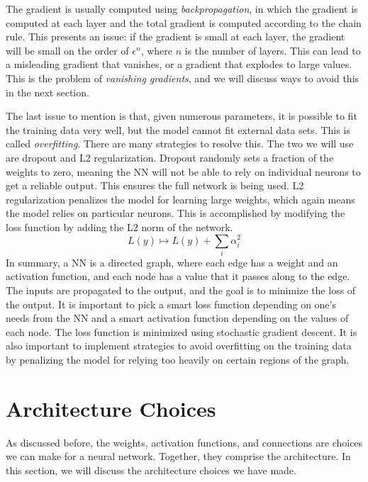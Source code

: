 The gradient is usually computed using \textit{backpropagation}, in which the gradient is computed at each layer and the total gradient is computed according to the chain rule. This presents an issue: if the gradient is small at each layer, the gradient will be small on the order of $\epsilon^{n}$, where $n$ is the number of layers. This can lead to a misleading gradient that vanishes, or a gradient that explodes to large values. This is the problem of \textit{vanishing gradients}, and we will discuss ways to avoid this in the next section.

The last issue to mention is that, given numerous parameters, it is possible to fit the training data very well, but the model cannot fit external data sets. This is called \textit{overfitting}. There are many strategies to resolve this. The two we will use are dropout and L2 regularization. Dropout randomly sets a fraction of the weights to zero, meaning the NN will not be able to rely on individual neurons to get a reliable output. This ensures the full network is being used. L2 regularization penalizes the model for learning large weights, which again means the model relies on particular neurons. This is accomplished by modifying the loss function by adding the L2 norm of the network.
\begin{equation}
	L(y) \mapsto L(y)+\sum_i \alpha_i^2
\end{equation}
In summary, a NN is a directed graph, where each edge has a weight and an activation function, and each node has a value that it passes along to the edge. The inputs are propagated to the output, and the goal is to minimize the loss of the output. It is important to pick a smart loss function depending on one's needs from the NN and a smart activation function depending on the values of each node. The loss function is minimized using stochastic gradient descent. It is also important to implement strategies to avoid overfitting on the training data by penalizing the model for relying too heavily on certain regions of the graph.
\section{Architecture Choices}
As discussed before, the weights, activation functions, and connections are choices we can make for a neural network. Together, they comprise the architecture. In this section, we will discuss the architecture choices we have made.

